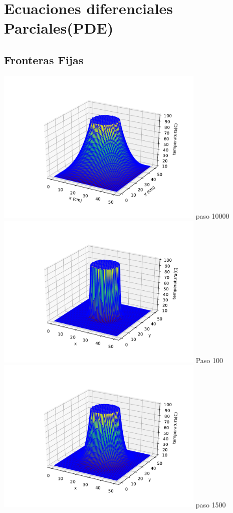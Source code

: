 \documentclass[12pt]{article}
\begin{document}
\section{Ecuaciones diferenciales Parciales(PDE)}

\begin{centering}

\subsection{Fronteras Fijas}
\includegraphics[width=0.75\textwidth]{3d2.pdf}
paso 10000
\\
\includegraphics[width=0.75\textwidth]{3d3.pdf}
Paso 100
\\
\includegraphics[width=0.75\textwidth]{3d4.pdf}
paso 1500

\end{centering}
\end{document}
